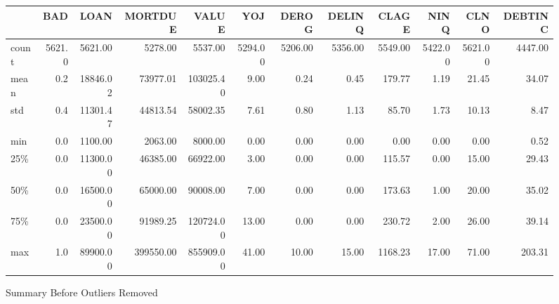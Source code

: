 \begin{appendices}
\begin{landscape}
\begin{figure}[ht]
	\centering
	\renewcommand{\arraystretch}{2}
	\begin{tabular}{lrrrrrrrrrrr}
	\toprule
	{} &     BAD &      LOAN &    MORTDUE &      VALUE &      YOJ &    DEROG &   DELINQ &    CLAGE &     NINQ &     CLNO &  DEBTINC \\
	\midrule
	count &  5621.0 &   5621.00 &    5278.00 &    5537.00 &  5294.00 &  5206.00 &  5356.00 &  5549.00 &  5422.00 &  5621.00 &  4447.00 \\
	mean  &     0.2 &  18846.02 &   73977.01 &  103025.40 &     9.00 &     0.24 &     0.45 &   179.77 &     1.19 &    21.45 &    34.07 \\
	std   &     0.4 &  11301.47 &   44813.54 &   58002.35 &     7.61 &     0.80 &     1.13 &    85.70 &     1.73 &    10.13 &     8.47 \\
	min   &     0.0 &   1100.00 &    2063.00 &    8000.00 &     0.00 &     0.00 &     0.00 &     0.00 &     0.00 &     0.00 &     0.52 \\
	25\%   &     0.0 &  11300.00 &   46385.00 &   66922.00 &     3.00 &     0.00 &     0.00 &   115.57 &     0.00 &    15.00 &    29.43 \\
	50\%   &     0.0 &  16500.00 &   65000.00 &   90008.00 &     7.00 &     0.00 &     0.00 &   173.63 &     1.00 &    20.00 &    35.02 \\
	75\%   &     0.0 &  23500.00 &   91989.25 &  120724.00 &    13.00 &     0.00 &     0.00 &   230.72 &     2.00 &    26.00 &    39.14 \\
	max   &     1.0 &  89900.00 &  399550.00 &  855909.00 &    41.00 &    10.00 &    15.00 &  1168.23 &    17.00 &    71.00 &   203.31 \\
	\bottomrule
	\end{tabular}
	\caption{Summary Before Outliers Removed \label{SUM_BFR_TBL}}
\end{figure}
\end{landscape}


\end{appendices}
